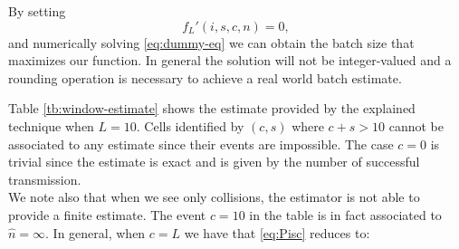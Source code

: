 \documentclass[11pt,a4paper,twoside,openright]{book}
\newcommand{\fw}{f_{L}}
\begin{document}
By setting 
\begin{equation}
\fw'(i,s,c,n)=0,
\label{eq:dummy-eq}
\end{equation}
and numerically solving \eqref{eq:dummy-eq} we can obtain the batch size that maximizes our function. In general the solution will not be integer-valued and a rounding operation is necessary to achieve a real world batch estimate.\\
\begin{table}[H]
\centering
\caption[\emph{Window based estimate: Possible estimates when $L=10$}]{Estimate given $(i,c,s)$ when $L=i+c+s =10$.}
\label{tb:window-estimate}
\end{table}

Table \ref{tb:window-estimate} shows the estimate provided by the explained technique when $L=10$. Cells identified by $(c,s)$ where $c+s>10$ cannot be associated to any estimate since their events are impossible. The case $c=0$ is trivial since the estimate is exact and is given by the number of successful transmission.\\
We note also that when we see only collisions, the estimator is not able to provide a finite estimate. The event $c=10$ in the table is in fact associated to $\hat{n}=\infty$. In general, when $c=L$ we have that \eqref{eq:Pisc} reduces to:
\end{document}
